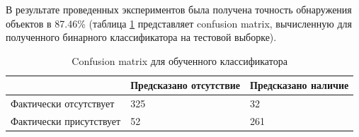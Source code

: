 \documentclass{thesisby}
\begin{document}
В результате проведенных экспериментов была получена точность обнаружения объектов в 87.46\% (таблица \ref{table:solar_detection_cm} представляет confusion matrix, вычисленную для полученного бинарного классификатора на тестовой выборке).

\begin{table}[H]
	\caption{Confusion matrix для обученного классификатора}
	\label{table:solar_detection_cm}
	\centering
	\begin{tabular}{|p{6cm}|p{4cm}|p{4cm}|}
		\hline
		& \textbf{Предсказано отсутствие} & \textbf{Предсказано наличие}\\
		\hline
	    Фактически отсутствует & 325  & 32 \\
	    \hline
		Фактически присутствует & 52 & 261 \\
		\hline
	\end{tabular}			
\end{table}	



\end{document}
